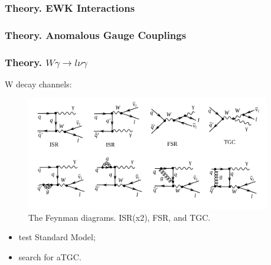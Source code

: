 \begin{frame}\frametitle{Theory. EWK Interactions}
\end{frame}%

\begin{frame}\frametitle{Theory. Anomalous Gauge Couplings}
\end{frame}%

\begin{frame}\frametitle{Theory. $W\gamma\rightarrow l\nu\gamma$}
  \scriptsize
   W decay channels:

   \begin{figure}[htb]
      \begin{center}
        \scriptsize
          \includegraphics[width=0.95\textwidth]{../figs/WgAbout/feynmWg_LO_NLO.png}
          \caption{\scriptsize{The Feynman diagrams. ISR(x2), FSR, and TGC.}}
       \end{center}
    \end{figure}

\begin{itemize}
\item test Standard Model;
\item search for aTGC.
\end{itemize}
\end{frame}%
